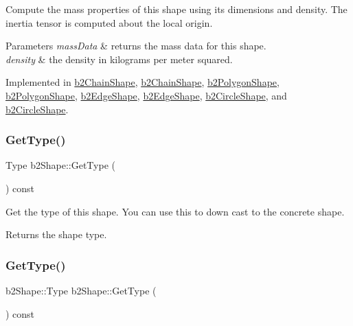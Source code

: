 Compute the mass properties of this shape using its dimensions and density. The inertia tensor is computed about the local origin. 
\begin{DoxyParams}{Parameters}
{\em mass\+Data} & returns the mass data for this shape. \\
\hline
{\em density} & the density in kilograms per meter squared. \\
\hline
\end{DoxyParams}


Implemented in \hyperlink{classb2ChainShape_aad3671d6eab61f6b26e2f1b6ac50bb98}{b2\+Chain\+Shape}, \hyperlink{classb2ChainShape_a55efeb6d4005c1ca4b01cbcc5d7369db}{b2\+Chain\+Shape}, \hyperlink{classb2PolygonShape_a33e75858a1b9e26fdf7f723825cda878}{b2\+Polygon\+Shape}, \hyperlink{classb2PolygonShape_a908db2a51fc79fd49d6fe06be2cd8474}{b2\+Polygon\+Shape}, \hyperlink{classb2EdgeShape_a1cd695882766566f76bb0fedf346407d}{b2\+Edge\+Shape}, \hyperlink{classb2EdgeShape_ac738c1e0ab2f4dfbab26e3942efa60af}{b2\+Edge\+Shape}, \hyperlink{classb2CircleShape_a5f2e516df3f347a51017bca2bd0e5aab}{b2\+Circle\+Shape}, and \hyperlink{classb2CircleShape_a7dc07891abd015863fbf03076e47eec5}{b2\+Circle\+Shape}.

\mbox{\label{classb2Shape_a605b5f1dd744ea3cf49f20fbde1e3b09}} 
\subsubsection{\texorpdfstring{Get\+Type()}{GetType()}\hspace{0.1cm}{\footnotesize\ttfamily [1/2]}}
{\footnotesize\ttfamily Type b2\+Shape\+::\+Get\+Type (\begin{DoxyParamCaption}{ }\end{DoxyParamCaption}) const}

Get the type of this shape. You can use this to down cast to the concrete shape. \begin{DoxyReturn}{Returns}
the shape type. 
\end{DoxyReturn}
\mbox{\label{classb2Shape_a600cceee6186d81bb1b8ab142324bba6}} 
\subsubsection{\texorpdfstring{Get\+Type()}{GetType()}\hspace{0.1cm}{\footnotesize\ttfamily [2/2]}}
{\footnotesize\ttfamily b2\+Shape\+::\+Type b2\+Shape\+::\+Get\+Type (\begin{DoxyParamCaption}{ }\end{DoxyParamCaption}) const\hspace{0.3cm}{\ttfamily [inline]}}

